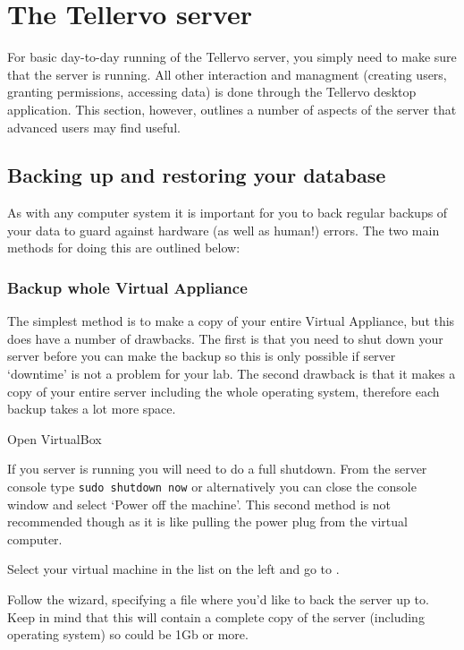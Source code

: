 
\chapter{The Tellervo server}
\label{txt:servermaintenance}

For basic day-to-day running of the Tellervo server, you simply need to make sure that the server is running.  All other interaction and managment (creating users, granting permissions, accessing data) is done through the Tellervo desktop application.  This section, however, outlines a number of aspects of the server that advanced users may find useful.

\section{Backing up and restoring your database}
As with any computer system it is important for you to back regular backups of your data to guard against hardware (as well as human!) errors. The two main methods for doing this are outlined below:

\subsection{Backup whole Virtual Appliance}
\label{txt:BackupVA}
The simplest method is to make a copy of your entire Virtual Appliance, but this does have a number of drawbacks.  The first is that you need to shut down your server before you can make the backup so this is only possible if server `downtime' is not a problem for your lab.  The second drawback is that it makes a copy of your entire server including the whole operating system, therefore each backup takes a lot more space.  

\begin{enumerate*}
 \item Open VirtualBox
 \item If you server is running you will need to do a full shutdown.  From the server console type \verb|sudo shutdown now| or alternatively you can close the console window and select `Power off the machine'.  This second method is not recommended though as it is like pulling the power plug from the virtual computer.
 \item Select your virtual machine in the list on the left and go to .
 \item Follow the wizard, specifying a file where you'd like to back the server up to.  Keep in mind that this will contain a complete copy of the server (including operating system) so could be 1Gb or more.
\end{enumerate*}

